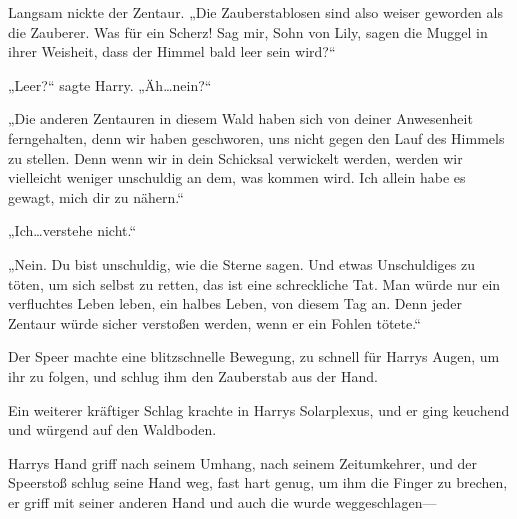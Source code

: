 Langsam nickte der Zentaur.
„Die Zauberstablosen sind also weiser geworden als die Zauberer. Was für ein Scherz! Sag mir, Sohn von Lily, sagen die Muggel in ihrer Weisheit, dass der Himmel bald leer sein wird?“

„Leer?“ sagte Harry. „Äh…nein?“

„Die anderen Zentauren in diesem Wald haben sich von deiner Anwesenheit ferngehalten, denn wir haben geschworen, uns nicht gegen den Lauf des Himmels zu stellen. Denn wenn wir in dein Schicksal verwickelt werden, werden wir vielleicht weniger unschuldig an dem, was kommen wird. Ich allein habe es gewagt, mich dir zu nähern.“

„Ich…verstehe nicht.“

„Nein. Du bist unschuldig, wie die Sterne sagen. Und etwas Unschuldiges zu töten, um sich selbst zu retten, das ist eine schreckliche Tat. Man würde nur ein verfluchtes Leben leben, ein halbes Leben, von diesem Tag an. Denn jeder Zentaur würde sicher verstoßen werden, wenn er ein Fohlen tötete.“

Der Speer machte eine blitzschnelle Bewegung, zu schnell für Harrys Augen, um ihr zu folgen, und schlug ihm den Zauberstab aus der Hand.

Ein weiterer kräftiger Schlag krachte in Harrys Solarplexus, und er ging keuchend und würgend auf den Waldboden.

Harrys Hand griff nach seinem Umhang, nach seinem Zeitumkehrer, und der Speerstoß schlug seine Hand weg, fast hart genug, um ihm die Finger zu brechen, er griff mit seiner anderen Hand und auch die wurde weggeschlagen—

